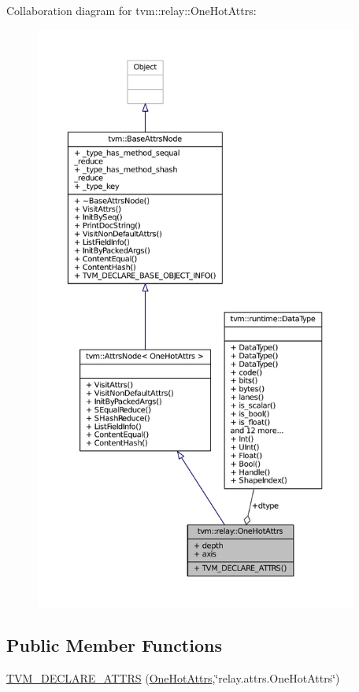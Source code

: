 Collaboration diagram for tvm\+:\+:relay\+:\+:One\+Hot\+Attrs\+:
\nopagebreak
\begin{figure}[H]
\begin{center}
\leavevmode
\includegraphics[height=550pt]{structtvm_1_1relay_1_1OneHotAttrs__coll__graph}
\end{center}
\end{figure}
\subsection*{Public Member Functions}
\begin{DoxyCompactItemize}
\item 
\hyperlink{structtvm_1_1relay_1_1OneHotAttrs_a4814ce0d6608d11371480abe0826ee02}{T\+V\+M\+\_\+\+D\+E\+C\+L\+A\+R\+E\+\_\+\+A\+T\+T\+RS} (\hyperlink{structtvm_1_1relay_1_1OneHotAttrs}{One\+Hot\+Attrs},\char`\"{}relay.\+attrs.\+One\+Hot\+Attrs\char`\"{})
\end{DoxyCompactItemize}
